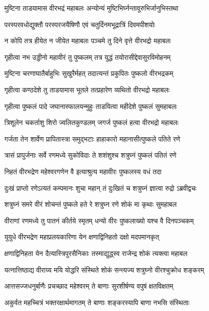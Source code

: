 \twolineshloka
{मुष्टिना ताडयामास वीरभद्रं महाबलः}
{अन्योन्यं मुष्टिभिर्घ्नन्तावूरुभिर्जानुभिस्तथा}%

\twolineshloka
{परस्परवधोद्युक्तौ परस्परजयैषिणौ}
{एवं चतुर्दिनमभूद्रात्रिं दिवमपीशयोः}%

\twolineshloka
{न कोपि तत्र हीयेत न जीयेत महाबलः}
{पञ्चमे तु दिने वृत्ते वीरभद्रो महाबलः}%

\twolineshloka
{गृहीत्वा नभ उड्डीनो महावीरं तु पुष्कलम्}
{तत्र युद्धं तयोरासीद्देवासुरविमोहनम्}%

\twolineshloka
{मुष्टिना चरणाघातैर्बाहुभिः सुखुरैर्महत्}
{तदात्यन्तं प्रकुपितः पुष्कलो वीरभद्रकम्}%

\twolineshloka
{गृहीत्वा कण्ठदेशे तु ताडयामास भूतले}
{तत्प्रहारेण व्यथितो वीरभद्रो महाबलः}%

\twolineshloka
{गृहीत्वा पुष्कलं पादे जघानास्फालयन्मुहुः}
{ताडयित्वा महीदेशे पुष्कलं सुमहाबलः}%

\twolineshloka
{त्रिशूलेन चकर्ताशु शिरो ज्वलितकुण्डलम्}
{जगर्ज पुष्कलं हत्वा वीरभद्रो महाबलः}%

\twolineshloka
{गर्जता तेन शार्वेण प्रापितास्त्रा समुद्भटाः}
{हाहाकारो महानासीत्पुष्कले पतिते रणे}%

\twolineshloka
{त्रासं प्रापुर्जनाः सर्वे रणमध्ये सुकोविदाः}
{ते शशंशुश्च शत्रुघ्नं पुष्कलं पतितं रणे}%

\twolineshloka
{निहतं वीरभद्रेण महेश्वरगणेन वै}
{इत्याश्रुत्य महावीरः पुष्कलस्य वधं तदा}%

\twolineshloka
{दुःखं प्राप्तो रणेऽत्यतं कम्पमानः शुचा महान्}
{तं दुःखितं च शत्रुघ्नं ज्ञात्वा रुद्रो ऽब्रवीद्वचः}%

\twolineshloka
{शत्रुघ्नं समरे वीरं शोचन्तं पुष्कले हते}
{रे शत्रुघ्न रणे शोकं मा कृथाः सुमहाबल}%

\twolineshloka
{वीराणां रणमध्ये तु पातनं कीर्तये स्मृतम्}
{धन्यो वीरः पुष्कलाख्यो यश्च वै दिनपञ्चकम्}%

\twolineshloka
{युयुधे वीरभद्रेण महाप्रलयकारिणा}
{येन क्षणाद्विनिहतो दक्षो मदपमानकृत्}%

\twolineshloka
{क्षणाद्विनिहता येन दैत्यास्त्रिपुरसैनिकाः}
{तस्माद्युद्ध्स्व राजेन्द्र शोकं त्यक्त्वा महाबल}%

\twolineshloka
{यत्नात्तिष्ठाद्य वीराग्र्य मयि योद्धरि संस्थिते}
{शोकं सन्त्यज्य शत्रुघ्नो वीरश्चुक्रोध शङ्करम्}%

\twolineshloka
{आत्तसज्जधनुर्बाणैः प्रचच्छाद महेश्वरम्}
{ते बाणाः सुरशीर्षण्य वपुषं क्षतविक्षतम्}%

\twolineshloka
{अकुर्वत महच्चित्रं भक्तरक्षार्थमागतम्}
{ते बाणाः शङ्करस्यापि बाणा नभसि संस्थिताः}%

